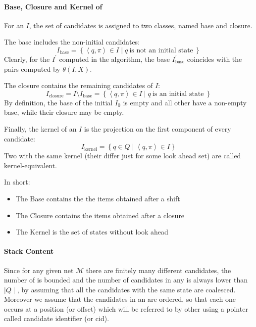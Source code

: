 \documentclass[english]{article}
\begin{document}
\paragraph[Base, Closure and Kernel of m-state]{Base, Closure and Kernel of \mstate}
\label{par:base-closure-kernel}

For an \mstate \(I\), the set of candidates is assigned to two classes, named base and closure.

The base includes the non-initial candidates:
\[ I_{\text{base}} = \left\{ \left\langle q, \pi \right\rangle \in I \mid q \ \text{is not an initial state} \ \right\} \]
Clearly, for the \mstate \(I^\prime\) computed in the algorithm, the base \(I^\prime_{\text{base}}\) coincides with the pairs computed by \(\theta(I, X)\).

The closure contains the remaining candidates of \(I\):
\[ I_{\text{closure}} = I \setminus I_{\text{base}} = \left\{ \left\langle q , \pi \right\rangle \in I \mid q \ \text{is an initial state} \ \right\} \]
By definition, the base of the initial \mstate \(I_0\) is empty and all other \mstates have a non-empty base, while their closure may be empty.

Finally, the kernel of an \mstate \(I\) is the projection on the first component of every candidate:
\[ I_{\text{kernel}} = \left\{ q \in Q \mid \left\langle q, \pi \right\rangle \in I \right\} \]
Two \mstates with the same kernel (their differ just for some look ahead set) are called kernel-equivalent.

\bigskip
In short:

\begin{itemize}
  \item The Base contains the the items obtained after a shift
  \item The Closure contains the items obtained after a closure
  \item The Kernel is the set of states without look ahead
\end{itemize}

\paragraph{Stack Content}
\label{par:stack-content}

Since for any given net \(\mathcal{M}\) there are finitely many different candidates, the number of \mstates is bounded and the number of candidates in any \mstate is always lower than \(\mid Q \mid\), by assuming that all the candidates with the same state are coalesced.
Moreover we assume that the candidates in an \mstate are ordered, so that each one occurs at a position (or offset) which will be referred to by other \mstates using a pointer called candidate identifier (or cid).
\end{document}
